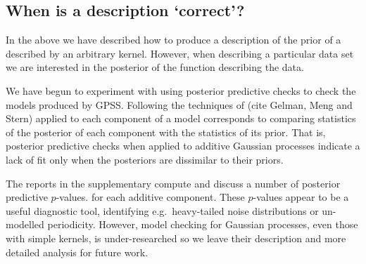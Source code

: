 \documentclass{article}
\def\ie{i.e.\ }
\def\eg{e.g.\ }
\begin{document}

\subsection{When is a description `correct'?}

In the above we have described how to produce a description of the prior of a \gp{} described by an arbitrary kernel.
However, when describing a particular data set we are interested in the posterior of the function describing the data.


We have begun to experiment with using posterior predictive checks to check the models produced by GPSS.
Following the techniques of (cite Gelman, Meng and Stern) applied to each component of a model corresponds to comparing statistics of the posterior of each component with the statistics of its prior.
That is, posterior predictive checks when applied to additive Gaussian processes indicate a lack of fit only when the posteriors are dissimilar to their priors.

The reports in the supplementary compute and discuss a number of posterior predictive $p$-values. for each additive component.
These $p$-values appear to be a useful diagnostic tool, identifying \eg heavy-tailed noise distributions or un-modelled periodicity.
However, model checking for Gaussian processes, even those with simple kernels, is under-researched so we leave their description and more detailed analysis for future work.
\end{document}
